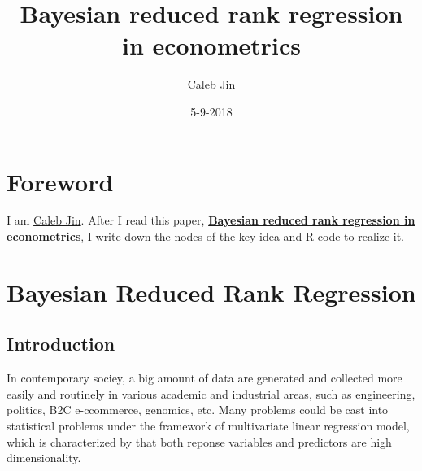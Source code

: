 \documentclass[]{book}
\title{Bayesian reduced rank regression in econometrics}
\author{Caleb Jin}
\date{5-9-2018}
\begin{document}
\maketitle

{
\setcounter{tocdepth}{1}
\tableofcontents
}
\hypertarget{foreword}{%
\chapter{Foreword}\label{foreword}}

I am \href{https://www.sjin.name/}{Caleb Jin}. After I read this paper, \textbf{\href{https://www.sciencedirect.com/science/article/pii/0304407695017739}{Bayesian reduced rank regression in econometrics}}\citep{Geweke}, I write down the nodes of the key idea and R code to realize it.

\newcommand\T{{\top}}
\newcommand\ubeta{{\boldsymbol \beta}}
\newcommand\uSigma{{\boldsymbol \Sigma}}
\newcommand\uepsilon{{\boldsymbol \epsilon}}
\newcommand\umu{{\boldsymbol \mu}}
\newcommand\utheta{{\boldsymbol \theta}}
\newcommand\bg{{\boldsymbol \gamma}}
\newcommand\uphi{{\boldsymbol \phi}}
\newcommand\0{{\bf 0}}
\newcommand\uA{{\bf A}}
\newcommand\ua{{\bf a}}
\newcommand\uB{{\bf B}}
\newcommand\ub{{\bf b}}
\newcommand\uC{{\bf C}}
\newcommand\uD{{\bf D}}
\newcommand\uE{{\bf E}}
\newcommand\ue{{\bf ue}}
\newcommand\uH{{\bf H}}
\newcommand\uI{{\bf I}}
\newcommand\uM{{\bf M}}
\newcommand\uQ{{\bf Q}}
\newcommand\uV{{\bf V}}
\newcommand\uX{{\bf X}}
\newcommand\ux{{\bf x}}
\newcommand\uY{{\bf Y}}
\newcommand\uy{{\bf y}}
\newcommand\uz{{\bf z}}

\newcommand\diag{{\rm diag}}

\hypertarget{bayesian-reduced-rank-regression}{%
\chapter{Bayesian Reduced Rank Regression}\label{bayesian-reduced-rank-regression}}

\hypertarget{introduction}{%
\section{Introduction}\label{introduction}}

In contemporary sociey, a big amount of data are generated and collected more easily and routinely in various academic and industrial areas, such as engineering, politics, B2C e-ccommerce, genomics, etc. Many problems could be cast into statistical problems under the framework of multivariate linear regression model, which is characterized by that both reponse variables and predictors are high dimensionality.
\end{document}
